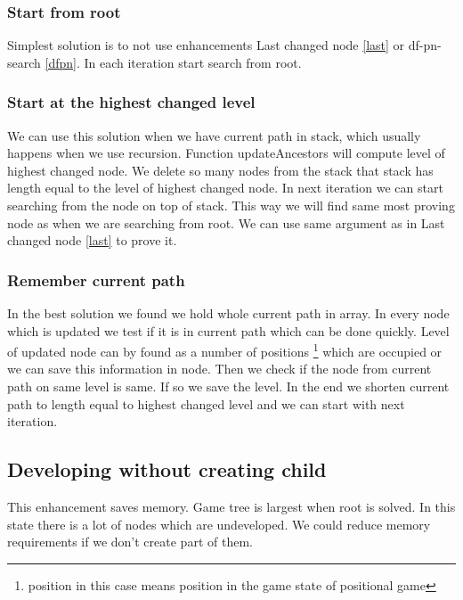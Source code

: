 \subsubsection{Start from root}

Simplest solution is to not use enhancements Last changed node \ref{last}
or df-pn-search \ref{dfpn}. In each iteration start search from root.

\subsubsection{Start at the highest changed level}

We can use this solution when we have current path in stack, which usually
happens when we use recursion. Function updateAncestors will compute level of
highest changed node. We delete so many nodes from the stack that stack has
length equal to the level of highest changed node. In next iteration we can
start searching from the node on  top of stack. This way
we will find same most proving node as when we are searching from root. We can
use same argument as in Last changed node \ref{last} to prove it.

\subsubsection{Remember current path}

In the best solution we found we hold whole current path in array. In every
node which is updated we test if it is in current path which can be done
quickly.  Level of updated node can by found as a number of positions
\footnote{ position in this case means position in the game state of positional
game} which are occupied or we can save this information in node. Then we
check if the node from current path on same level is same. If so we save the
level. In the end we shorten current path to length equal to highest changed
level and we can start with next iteration.

\subsection{Developing without creating child}

This enhancement saves memory. Game tree is largest when root is solved.  In
this state there is a lot of nodes which are undeveloped.  We could reduce memory requirements if we don't create part of
them. 

